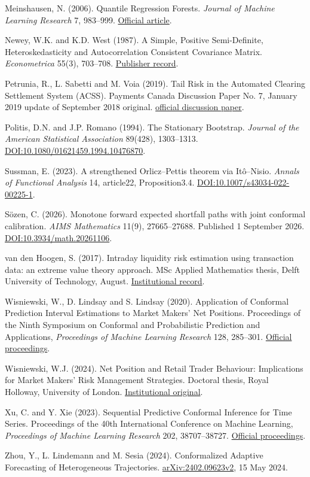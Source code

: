 \documentclass[10pt,a4paper]{article}
\begin{document}
Meinshausen, N. (2006). Quantile Regression Forests. \emph{Journal of Machine Learning Research} 7, 983--999. \href{https://www.jmlr.org/papers/volume7/meinshausen06a/meinshausen06a.pdf}{Official article}.

Newey, W.K. and K.D. West (1987). A Simple, Positive Semi-Definite, Heteroskedasticity and Autocorrelation Consistent Covariance Matrix. \emph{Econometrica} 55(3), 703--708. \href{https://www.jstor.org/stable/1913610}{Publisher record}.

Petrunia, R., L. Sabetti and M. Voia (2019). Tail Risk in the Automated Clearing Settlement System (ACSS). Payments Canada Discussion Paper No. 7, January 2019 update of September 2018 original. \href{https://www.paiements.ca/sites/default/files/tail_risk_in_the_automated_clearing_settlement_system_acss.pdf}{official discussion paper}.

Politis, D.N. and J.P. Romano (1994). The Stationary Bootstrap. \emph{Journal of the American Statistical Association} 89(428), 1303--1313. \href{https://doi.org/10.1080/01621459.1994.10476870}{DOI:10.1080/01621459.1994.10476870}.

Sussman, E. (2023). A strengthened Orlicz--Pettis theorem via Itô--Nisio. \emph{Annals of Functional Analysis} 14, article22, Proposition3.4. \href{https://doi.org/10.1007/s43034-022-00225-1}{DOI:10.1007/s43034-022-00225-1}.

Sözen, C. (2026). Monotone forward expected shortfall paths with joint conformal calibration. \emph{AIMS Mathematics} 11(9), 27665--27688. Published 1 September 2026. \href{https://www.aimspress.com/article/doi/10.3934/math.20261106}{DOI:10.3934/math.20261106}.

van den Hoogen, S. (2017). Intraday liquidity risk estimation using transaction data: an extreme value theory approach. MSc Applied Mathematics thesis, Delft University of Technology, August. \href{https://resolver.tudelft.nl/uuid:1c0c4545-bb07-4916-aa37-1d4bea3b7872}{Institutional record}.

Wisniewski, W., D. Lindsay and S. Lindsay (2020). Application of Conformal Prediction Interval Estimations to Market Makers' Net Positions. Proceedings of the Ninth Symposium on Conformal and Probabilistic Prediction and Applications, \emph{Proceedings of Machine Learning Research} 128, 285--301. \href{https://proceedings.mlr.press/v128/wisniewski20a.html}{Official proceedings}.

Wisniewski, W.J. (2024). Net Position and Retail Trader Behaviour: Implications for Market Makers' Risk Management Strategies. Doctoral thesis, Royal Holloway, University of London. \href{https://pure.royalholloway.ac.uk/ws/portalfiles/portal/63018039/2024WisniewskiWJWphd.pdf}{Institutional original}.

Xu, C. and Y. Xie (2023). Sequential Predictive Conformal Inference for Time Series. Proceedings of the 40th International Conference on Machine Learning, \emph{Proceedings of Machine Learning Research} 202, 38707--38727. \href{https://proceedings.mlr.press/v202/xu23r.html}{Official proceedings}.

Zhou, Y., L. Lindemann and M. Sesia (2024). Conformalized Adaptive Forecasting of Heterogeneous Trajectories. \href{https://arxiv.org/abs/2402.09623v2}{arXiv:2402.09623v2}, 15 May 2024.
\end{document}
